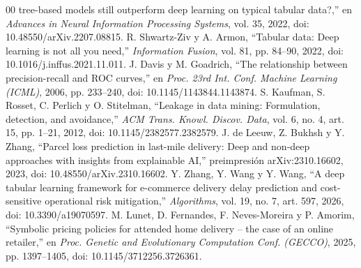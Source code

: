 \documentclass[conference]{IEEEtran}
\begin{document}
\begin{thebibliography}{00}
tree-based models still outperform deep learning on typical tabular data?,''
en \textit{Advances in Neural Information Processing Systems}, vol. 35, 2022,
doi: 10.48550/arXiv.2207.08815.
 R. Shwartz-Ziv y A. Armon, ``Tabular data: Deep learning is
not all you need,'' \textit{Information Fusion}, vol. 81, pp. 84--90, 2022,
doi: 10.1016/j.inffus.2021.11.011.
 J. Davis y M. Goadrich, ``The relationship between
precision-recall and ROC curves,'' en \textit{Proc. 23rd Int. Conf. Machine
Learning (ICML)}, 2006, pp. 233--240, doi: 10.1145/1143844.1143874.
 S. Kaufman, S. Rosset, C. Perlich y O. Stitelman, ``Leakage
in data mining: Formulation, detection, and avoidance,'' \textit{ACM Trans.
Knowl. Discov. Data}, vol. 6, no. 4, art. 15, pp. 1--21, 2012,
doi: 10.1145/2382577.2382579.
 J. de Leeuw, Z. Bukhsh y Y. Zhang, ``Parcel loss prediction
in last-mile delivery: Deep and non-deep approaches with insights from
explainable AI,'' preimpresión arXiv:2310.16602, 2023,
doi: 10.48550/arXiv.2310.16602.
 Y. Zhang, Y. Wang y Y. Wang, ``A deep tabular learning
framework for e-commerce delivery delay prediction and cost-sensitive
operational risk mitigation,'' \textit{Algorithms}, vol. 19, no. 7, art. 597,
2026, doi: 10.3390/a19070597.
 M. Lunet, D. Fernandes, F. Neves-Moreira y P. Amorim,
``Symbolic pricing policies for attended home delivery -- the case of an
online retailer,'' en \textit{Proc. Genetic and Evolutionary Computation
Conf. (GECCO)}, 2025, pp. 1397--1405, doi: 10.1145/3712256.3726361.
\end{thebibliography}
\end{document}
